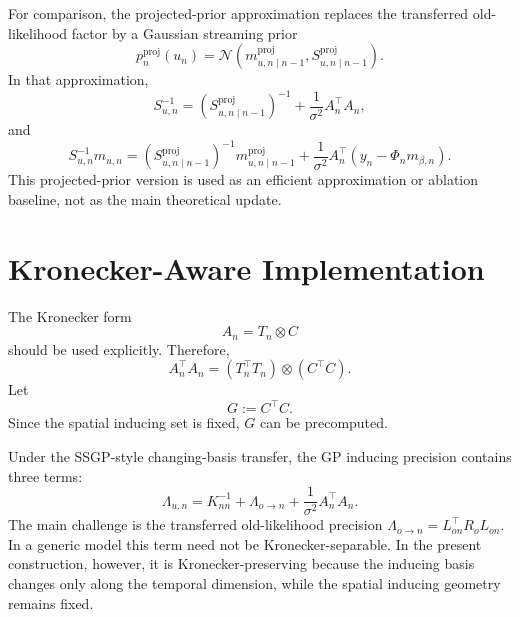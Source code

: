\documentclass[12pt]{article}
\begin{document}
For comparison, the projected-prior approximation replaces the transferred
old-likelihood factor by a Gaussian streaming prior
\begin{equation}
    p_n^{\mathrm{proj}}(u_n)
    =
    \mathcal{N}
    \left(
        m_{u,n\mid n-1}^{\mathrm{proj}},
        S_{u,n\mid n-1}^{\mathrm{proj}}
    \right).
\end{equation}
In that approximation,
\begin{equation}
    S_{u,n}^{-1}
    =
    \left(
        S_{u,n\mid n-1}^{\mathrm{proj}}
    \right)^{-1}
    +
    \frac{1}{\sigma^2}A_n^\top A_n,
\end{equation}
and
\begin{equation}
    S_{u,n}^{-1}m_{u,n}
    =
    \left(
        S_{u,n\mid n-1}^{\mathrm{proj}}
    \right)^{-1}
    m_{u,n\mid n-1}^{\mathrm{proj}}
    +
    \frac{1}{\sigma^2}
    A_n^\top
    \left(
        y_n-\Phi_nm_{\beta,n}
    \right).
\end{equation}
This projected-prior version is used as an efficient approximation or ablation baseline,
not as the main theoretical update.

\section{Kronecker-Aware Implementation}
\label{sec:kronecker_aware_implementation}

The Kronecker form
\begin{equation}
    A_n=T_n\otimes C
\end{equation}
should be used explicitly. Therefore,
\begin{equation}
    A_n^\top A_n
    =
    (T_n^\top T_n)\otimes(C^\top C).
\end{equation}
Let
\begin{equation}
    G:=C^\top C.
\end{equation}
Since the spatial inducing set is fixed, \(G\) can be precomputed.

Under the SSGP-style changing-basis transfer, the GP inducing precision contains three
terms:
\begin{equation}
    \Lambda_{u,n}
    =
    K_{nn}^{-1}
    +
    \Lambda_{o\rightarrow n}
    +
    \frac{1}{\sigma^2}
    A_n^\top A_n.
    \label{eq:kronecker_precision_with_old_transfer}
\end{equation}
The main challenge is the transferred old-likelihood precision
\(\Lambda_{o\rightarrow n}=L_{on}^\top R_oL_{on}\). In a generic model this term need
not be Kronecker-separable. In the present construction, however, it is
Kronecker-preserving because the inducing basis changes only along the temporal
dimension, while the spatial inducing geometry remains fixed.
\end{document}

